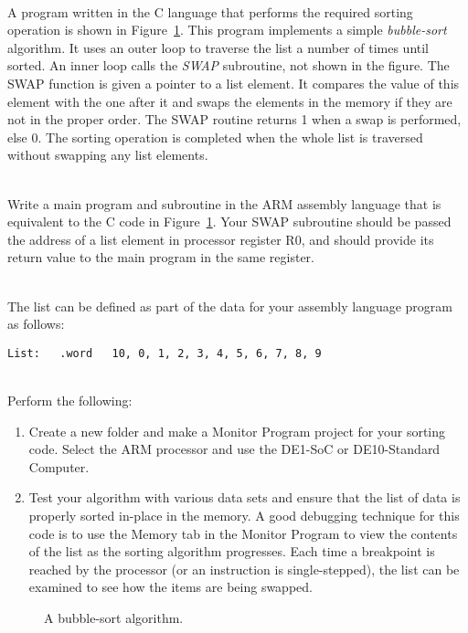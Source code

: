 \documentclass[epsfig,10pt,fullpage]{article}
\begin{document}
~\\
\noindent
A program written in the C language that performs the required sorting operation is shown in
Figure~\ref{fig:C_code}. This program implements a simple {\it bubble-sort} algorithm. It uses
an outer loop to traverse the list a number of times until sorted. An inner loop 
calls the {\it SWAP} subroutine, not shown in the figure. The SWAP function is given a
pointer to a list element. It compares the value of this element with the one after it
and swaps the elements in the memory if they are not in the proper order. The SWAP routine 
returns 1 when a swap is performed, else 0. The sorting operation is completed when the
whole list is traversed without swapping any list elements. 

~\\
\noindent
Write a main program and subroutine in the ARM assembly language that is equivalent to the C code 
in Figure~\ref{fig:C_code}. Your SWAP subroutine should be passed the address of a list element 
in processor register R0, and should provide its return value to the main program in the same 
register.  

~\\
\noindent
The list can be defined as part of the data for your assembly language program as follows:

\begin{lstlisting}[style=defaultArmStyle]
List: 	.word 	10, 0, 1, 2, 3, 4, 5, 6, 7, 8, 9
\end{lstlisting}

~\\
\noindent
Perform the following:

\begin{enumerate}
\item Create a new folder and make a Monitor Program project for your sorting code. Select
the ARM processor and use the DE1-SoC or DE10-Standard Computer.

\item
Test your algorithm with various data sets and ensure
that the list of data is properly sorted in-place in the memory. A good debugging
technique for this code is to use the Memory tab in the Monitor Program to view the
contents of the list as the sorting algorithm progresses. Each time a breakpoint is reached by
the processor (or an instruction is single-stepped), the list can be examined to see how
the items are being swapped.
\end{enumerate}

\begin{figure}[H]
\begin{center}

\end{center}
\caption{A bubble-sort algorithm.}
\label{fig:C_code}
\end{figure}
\end{document}
